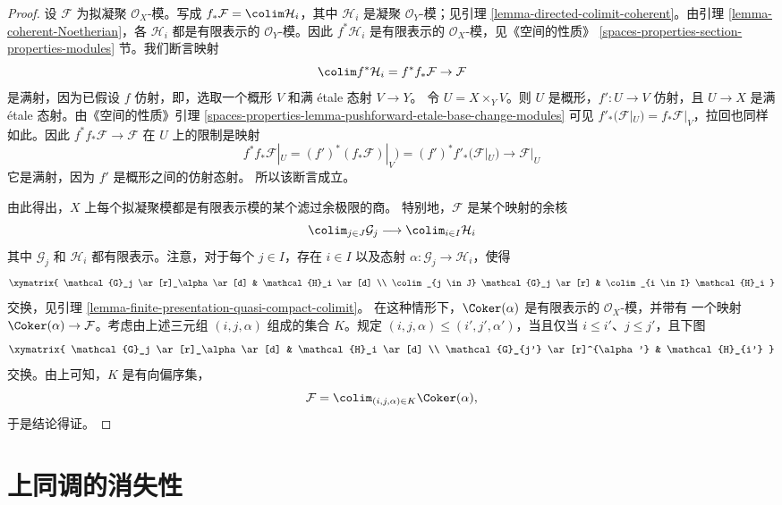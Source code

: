 \begin{proof}
设 $\mathcal{F}$ 为拟凝聚 $\mathcal{O}_X$-模。写成
$f_*\mathcal{F} = \colim \mathcal{H}_i$，其中 $\mathcal{H}_i$ 是凝聚
$\mathcal{O}_Y$-模；见引理 \ref{lemma-directed-colimit-coherent}。由引理
\ref{lemma-coherent-Noetherian}，各 $\mathcal{H}_i$ 都是有限表示的
$\mathcal{O}_Y$-模。因此 $f^*\mathcal{H}_i$ 是有限表示的
$\mathcal{O}_X$-模，见《空间的性质》
\ref{spaces-properties-section-properties-modules} 节。我们断言映射
$$
\colim f^*\mathcal{H}_i = f^*f_*\mathcal{F} \to \mathcal{F}
$$
是满射，因为已假设 $f$ 仿射，即，选取一个概形 $V$ 和满 \'etale 态射
$V \to Y$。%
令 $U = X \times_Y V$。则 $U$ 是概形，$f' : U \to V$ 仿射，且
$U \to X$ 是满 \'etale 态射。由《空间的性质》引理
\ref{spaces-properties-lemma-pushforward-etale-base-change-modules}
可见 $f'_*(\mathcal{F}|_U) = f_*\mathcal{F}|_V$，拉回也同样如此。因此
$f^*f_*\mathcal{F} \to \mathcal{F}$ 在 $U$ 上的限制是映射
$$
f^*f_*\mathcal{F}|_U = (f')^*(f_*\mathcal{F})|_V) =
(f')^*f'_*(\mathcal{F}|_U) \to \mathcal{F}|_U
$$
它是满射，因为 $f'$ 是概形之间的仿射态射。%
所以该断言成立。

\medskip\noindent
由此得出，$X$ 上每个拟凝聚模都是有限表示模的某个滤过余极限的商。
特别地，$\mathcal{F}$ 是某个映射的余核
$$
\colim_{j \in J} \mathcal{G}_j \longrightarrow \colim_{i \in I} \mathcal{H}_i
$$
其中 $\mathcal{G}_j$ 和 $\mathcal{H}_i$ 都有限表示。注意，对于每个
$j \in I$，存在 $i \in I$ 以及态射
$\alpha : \mathcal{G}_j \to \mathcal{H}_i$，使得%
$$
\xymatrix{
\mathcal{G}_j \ar[r]_\alpha \ar[d] & \mathcal{H}_i \ar[d] \\
\colim_{j \in J} \mathcal{G}_j \ar[r] &
\colim_{i \in I} \mathcal{H}_i
}
$$
交换，见引理 \ref{lemma-finite-presentation-quasi-compact-colimit}。
在这种情形下，$\Coker(\alpha)$ 是有限表示的 $\mathcal{O}_X$-模，并带有
一个映射 $\Coker(\alpha) \to \mathcal{F}$。考虑由上述三元组
$(i, j, \alpha)$ 组成的集合 $K$。规定
$(i, j, \alpha) \leq (i', j', \alpha')$，当且仅当
$i \leq i'$、$j \leq j'$，且下图
$$
\xymatrix{
\mathcal{G}_j \ar[r]_\alpha \ar[d] & \mathcal{H}_i \ar[d] \\
\mathcal{G}_{j'} \ar[r]^{\alpha'} &
\mathcal{H}_{i'}
}
$$
交换。由上可知，$K$ 是有向偏序集，
$$
\mathcal{F} = \colim_{(i, j, \alpha) \in K} \Coker(\alpha),
$$
于是结论得证。
\end{proof}






\section{上同调的消失性}
\label{section-vanishing}

